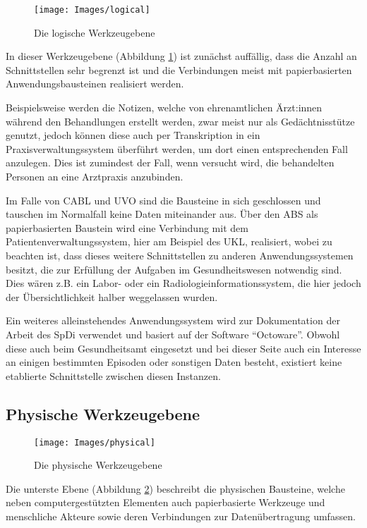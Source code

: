 \begin{figure}[h]
	\centering
	\texttt{[image: Images/logical]}
	\caption[Logische Werkzeugebene]{Die logische Werkzeugebene}
	\label{fig:logical}
\end{figure}

In dieser Werkzeugebene (Abbildung \ref{fig:logical}) ist zunächst auffällig, dass die Anzahl an Schnittstellen sehr begrenzt ist und die Verbindungen meist mit papierbasierten Anwendungsbausteinen realisiert werden.

Beispielsweise werden die Notizen, welche von ehrenamtlichen Ärzt:innen während den Behandlungen erstellt werden, zwar meist nur als Gedächtnisstütze genutzt, jedoch können diese auch per Transkription in ein Praxisverwaltungssystem überführt werden, um dort einen entsprechenden Fall anzulegen. Dies ist zumindest der Fall, wenn versucht wird, die behandelten Personen an eine Arztpraxis anzubinden.

Im Falle von \ac{CABL} und \ac{UVO} sind die Bausteine in sich geschlossen und tauschen im Normalfall keine Daten miteinander aus. Über den \ac{ABS} als papierbasierten Baustein wird eine Verbindung mit dem Patientenverwaltungssystem, hier am Beispiel des \ac{UKL}, realisiert, wobei zu beachten ist, dass dieses weitere Schnittstellen zu anderen Anwendungssystemen besitzt, die zur Erfüllung der Aufgaben im Gesundheitswesen notwendig sind. Dies wären z.B. ein Labor- oder ein Radiologieinformationssystem, die hier jedoch der Übersichtlichkeit halber weggelassen wurden.

Ein weiteres alleinstehendes Anwendungssystem wird zur Dokumentation der Arbeit des \ac{SpDi} verwendet und basiert auf der Software \enquote{Octoware}. Obwohl diese auch beim Gesundheitsamt eingesetzt und bei dieser Seite auch ein Interesse an einigen bestimmten Episoden oder sonstigen Daten besteht, existiert keine etablierte Schnittstelle zwischen diesen Instanzen.

\subsection{Physische Werkzeugebene}

\begin{figure}[h]
	\centering
	\texttt{[image: Images/physical]}
	\caption[Physische Werkzeugebene]{Die physische Werkzeugebene}
	\label{fig:physical}
\end{figure}

Die unterste Ebene (Abbildung \ref{fig:physical}) beschreibt die physischen Bausteine, welche neben computergestützten Elementen auch papierbasierte Werkzeuge und menschliche Akteure sowie deren Verbindungen zur Datenübertragung umfassen.

